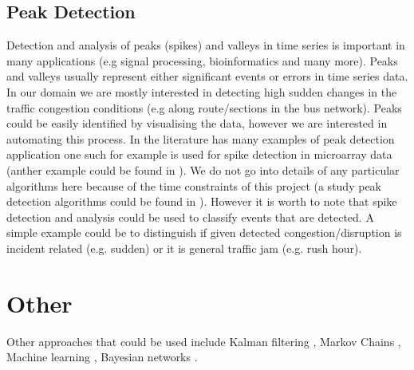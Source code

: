 \subsection{Peak Detection}
Detection and analysis of peaks (spikes) and valleys in time series is important in many applications (e.g signal processing, bioinformatics and many more). Peaks and valleys usually represent either significant events or errors in time series data. In our domain we are mostly interested in detecting high sudden changes in the traffic congestion conditions (e.g along route/sections in the bus network). Peaks could be easily identified by visualising the data, however we are interested in automating this process. In the literature has many examples of peak detection application one such for example is \cite{simplePeakDetection} used for spike detection in microarray data (anther example could be found in \cite{Azami2014491}). We do not go into details of any particular algorithms here because of the time constraints of this project (a study peak detection algorithms could be found in \cite{ventzas2011peak}). However it is worth to note that spike detection and analysis could be used to classify events that are detected. A simple example could be to distinguish if given detected congestion/disruption is incident related (e.g. sudden) or it is general traffic jam (e.g. rush hour).

\section{Other}
Other approaches that could be used include Kalman filtering \cite{kalmanFiltering} \cite{Guo201450}, Markov Chains \cite{Qi201495} \cite{Ramezani20121576}, Machine learning \cite{herring2010real}, Bayesian networks \cite{Wang201479}. 




